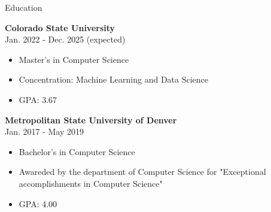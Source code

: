 \documentclass[12pt]{resumeclass}
\begin{document}
\vspace{12pt}
\resumesect
    {Education}
    {\textbf{Colorado State University}\\
    \normalsize{Jan. 2022 - Dec. 2025 (expected)}
    {\begin{itemize}[noitemsep,nolistsep]
	    \item Master's in Computer Science
	    \item Concentration: Machine Learning and Data Science
	    \item GPA: 3.67
    \end{itemize}}


    \vspace{3pt}
    \textbf{Metropolitan State University of Denver}\\
    \normalsize{Jan. 2017 - May 2019}
    {\begin{itemize}[noitemsep,nolistsep]
	    \item Bachelor's in Computer Science
	    \item Awareded by the department of Computer Science for "Exceptional accomplishments in Computer Science"
	    \item GPA: 4.00
    \end{itemize}}}
\vspace{12pt}
\end{document}
